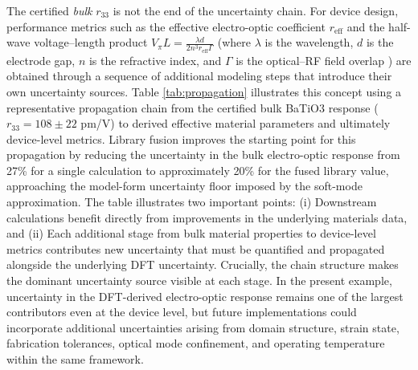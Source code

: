 \documentclass[prb,twocolumn,superscriptaddress,amsmath,amssymb,longbibliography]{revtex4-2}
\begin{document}
The certified {\em bulk} $r_{33}$ is not the end of the uncertainty chain. For device design, performance metrics such as the effective electro-optic coefficient $r_{\mathrm{eff}}$ and the half-wave voltage--length product $V_\pi L = \frac{\lambda d}{2 n^3 r_{\mathrm{eff}} \Gamma}$ (where $\lambda$ is the wavelength, $d$ is the electrode gap, $n$ is the refractive index, and $\Gamma$ is the optical--RF field overlap \cite{Wooten2000,Reed2010,Wang2018_LN_thin}) are obtained through a sequence of additional modeling steps that introduce their own uncertainty sources. Table \ref{tab:propagation} illustrates this concept using a representative propagation chain from the certified bulk BaTiO$3$ response ($r_{33}=108 \pm 22$ pm/V) to derived effective material parameters and ultimately device-level metrics. Library fusion improves the starting point for this propagation by reducing the uncertainty in the bulk electro-optic response from 27\% for a single calculation to approximately 20\% for the fused library value, approaching the model-form uncertainty floor imposed by the soft-mode approximation. The table illustrates two important points: (i) Downstream calculations benefit directly from improvements in the underlying materials data, and (ii) Each additional stage from bulk material properties to device-level metrics contributes new uncertainty that must be quantified and propagated alongside the underlying DFT uncertainty. Crucially, the chain structure makes the dominant uncertainty source visible at each stage. In the present example, uncertainty in the DFT-derived electro-optic response remains one of the largest contributors even at the device level, but future implementations could incorporate additional uncertainties arising from domain structure, strain state, fabrication tolerances, optical mode confinement, and operating temperature within the same framework.


\end{document}
